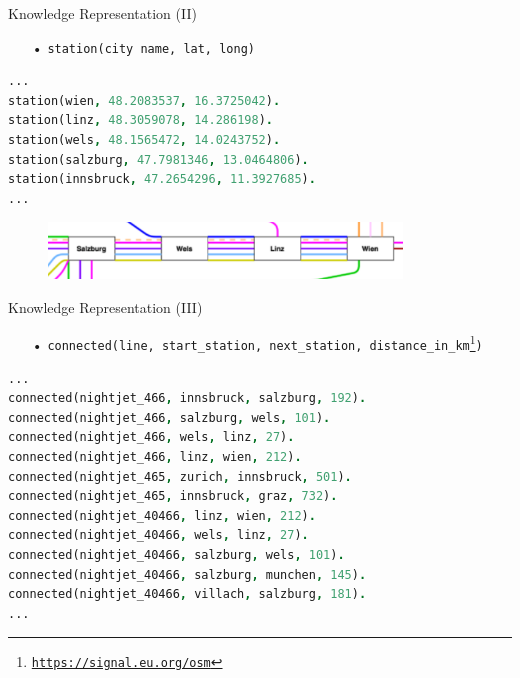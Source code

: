 \documentclass{beamer}
\begin{document}
    \begin{frame}[fragile]{Knowledge Representation (II)}

        \begin{itemize}
            \Large
            \centering
            \item[•] {\tt station(city name, lat, long)}
        \end{itemize}

        \begin{lstlisting}[frame=single, language=Prolog]
...
station(wien, 48.2083537, 16.3725042).
station(linz, 48.3059078, 14.286198).
station(wels, 48.1565472, 14.0243752).
station(salzburg, 47.7981346, 13.0464806).
station(innsbruck, 47.2654296, 11.3927685).
...
        \end{lstlisting}

        \begin{figure}
                \includegraphics[height=1.5cm]{figs/stations.png}
        \end{figure}

    \end{frame}

    \begin{frame}[fragile]{Knowledge Representation (III)}

        \begin{itemize}
            \centering
        \item[•] {\tt connected(line, start\_station, next\_station, distance\_in\_km\footnote{\url{https://signal.eu.org/osm}})}
        \end{itemize}

        \begin{lstlisting}[frame=single, language=Prolog]
...
connected(nightjet_466, innsbruck, salzburg, 192).
connected(nightjet_466, salzburg, wels, 101).
connected(nightjet_466, wels, linz, 27).
connected(nightjet_466, linz, wien, 212).
connected(nightjet_465, zurich, innsbruck, 501).
connected(nightjet_465, innsbruck, graz, 732).
connected(nightjet_40466, linz, wien, 212).
connected(nightjet_40466, wels, linz, 27).
connected(nightjet_40466, salzburg, wels, 101).
connected(nightjet_40466, salzburg, munchen, 145).
connected(nightjet_40466, villach, salzburg, 181).
...
        \end{lstlisting}
    \end{frame}
\end{document}
